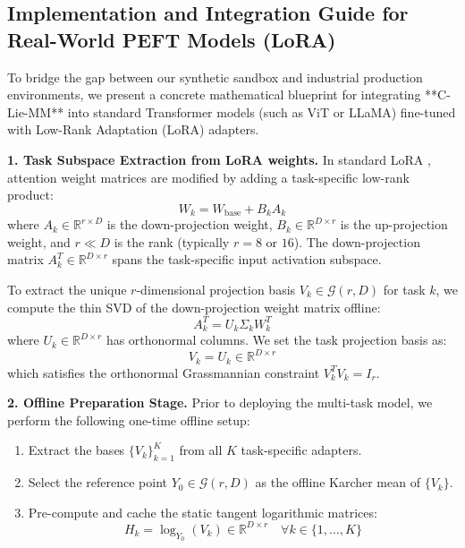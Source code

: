 \subsection{Implementation and Integration Guide for Real-World PEFT Models (LoRA)}
To bridge the gap between our synthetic sandbox and industrial production environments, we present a concrete mathematical blueprint for integrating **C-Lie-MM** into standard Transformer models (such as ViT or LLaMA) fine-tuned with Low-Rank Adaptation (LoRA) adapters.

\textbf{1. Task Subspace Extraction from LoRA weights.}
In standard LoRA \cite{hu2021lora}, attention weight matrices are modified by adding a task-specific low-rank product:
\begin{equation}
    W_k = W_{\text{base}} + B_k A_k
\end{equation}
where $A_k \in \mathbb{R}^{r \times D}$ is the down-projection weight, $B_k \in \mathbb{R}^{D \times r}$ is the up-projection weight, and $r \ll D$ is the rank (typically $r=8$ or $16$). The down-projection matrix $A_k^T \in \mathbb{R}^{D \times r}$ spans the task-specific input activation subspace. 

To extract the unique $r$-dimensional projection basis $V_k \in \mathcal{G}(r, D)$ for task $k$, we compute the thin SVD of the down-projection weight matrix offline:
\begin{equation}
    A_k^T = U_k \Sigma_k W_k^T
\end{equation}
where $U_k \in \mathbb{R}^{D \times r}$ has orthonormal columns. We set the task projection basis as:
\begin{equation}
    V_k = U_k \in \mathbb{R}^{D \times r}
\end{equation}
which satisfies the orthonormal Grassmannian constraint $V_k^T V_k = I_r$.

\textbf{2. Offline Preparation Stage.}
Prior to deploying the multi-task model, we perform the following one-time offline setup:
\begin{enumerate}
    \item Extract the bases $\{V_k\}_{k=1}^K$ from all $K$ task-specific adapters.
    \item Select the reference point $Y_0 \in \mathcal{G}(r, D)$ as the offline Karcher mean of $\{V_k\}$.
    \item Pre-compute and cache the static tangent logarithmic matrices:
    \begin{equation}
        H_k = \log_{Y_0}(V_k) \in \mathbb{R}^{D \times r} \quad \forall k \in \{1, \dots, K\}
    \end{equation}
\end{enumerate}

